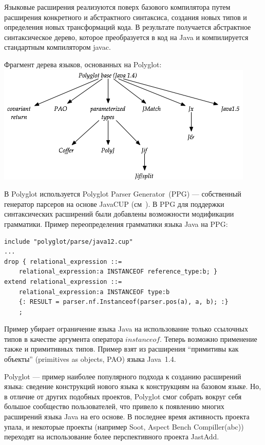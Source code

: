 \documentclass[a4paper,12pt,titlepage]{extarticle}
\begin{document}
Языковые расширения реализуются поверх базового компилятора путем расширения
конкретного и абстрактного синтаксиса, создания новых типов и
определения новых трансформаций кода. В результате получается абстрактное синтаксическое дерево,
которое преобразуется в код на Java и компилируется стандартным
компилятором javac.

\begin{center}
Фрагмент дерева языков, основанных на Polyglot:
\nopagebreak
 \includegraphics[scale=0.6]{img/polyglot-tree.png}
\end{center}

В Polyglot используется Polyglot Parser Generator~(PPG) --- собственный генератор
парсеров на основе JavaCUP (см~\cite{javacup}). В PPG для поддержки
синтаксических расширений были добавлены возможности модификации грамматики.
Пример переопределения грамматики языка Java на PPG:
\begin{verbatim}
include "polyglot/parse/java12.cup"
...
drop { relational_expression ::=
    relational_expression:a INSTANCEOF reference_type:b; }
extend relational_expression ::=
    relational_expression:a INSTANCEOF type:b
    {: RESULT = parser.nf.Instanceof(parser.pos(a), a, b); :}
    ;
\end{verbatim}
Пример убирает ограничение языка Java на использование только ссылочных типов в
качестве аргумента оператора $instanceof$. Теперь возможно применение также и
примитивных типов. Пример взят из расширения ``примитивы как объекты''
(primitives as objects, PAO) языка Java~1.4.

Polyglot --- пример наиболее популярного подхода к созданию расширений языка:
сведение конструкций нового языка к конструкциям на базовом языке. Но, в
отличие от других подобных проектов, Polyglot смог собрать вокруг себя большое
сообщество пользователей, что привело к появлению многих расширений языка Java
на его основе. В последнее время активность проекта упала, и некоторые проекты
(например Soot, Aspect Bench Compiller(abc)) переходят на использование более
перспективного проекта JastAdd.
\end{document}
